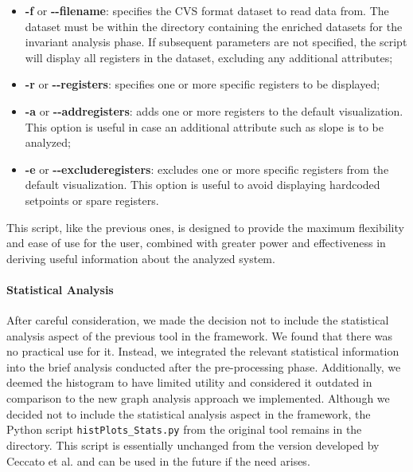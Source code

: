 \begin{itemize}
	\item \textbf{-f} or \textbf{{-}{-}filename}: specifies the CVS format dataset to read data from. The dataset must be within the directory containing the enriched datasets for the invariant analysis phase. If subsequent parameters are not specified, the script will display all registers in the dataset, excluding any additional attributes;
	
	\item \textbf{-r} or \textbf{{-}{-}registers}: specifies one or more specific registers to be displayed;
	
	\item \textbf{-a} or \textbf{{-}{-}addregisters}: adds one or more registers to the default visualization. This option is useful in case an additional attribute such as slope is to be analyzed;
	
	\item \textbf{-e} or \textbf{{-}{-}excluderegisters}: excludes one or more specific registers from the default visualization. This option is useful to avoid displaying hardcoded setpoints or spare registers.
\end{itemize}
This script, like the previous ones, is designed to provide the maximum flexibility and ease of use for the user, combined with greater power and effectiveness in deriving useful information about the analyzed system.

\paragraph{Statistical Analysis} After careful consideration, we made the decision not to include the statistical analysis aspect of the previous tool in the framework. We found that there was no practical use for it. Instead, we integrated the relevant statistical information into the brief analysis conducted after the pre-processing phase. Additionally, we deemed the histogram to have limited utility and considered it outdated in comparison to the new graph analysis approach we implemented. \newline
Although we decided not to include the statistical analysis aspect in the framework, the Python script \texttt{histPlots\_Stats.py} from the original tool remains in the directory. This script is essentially unchanged from the version developed by Ceccato et al. and can be used in the future if the need arises. 

